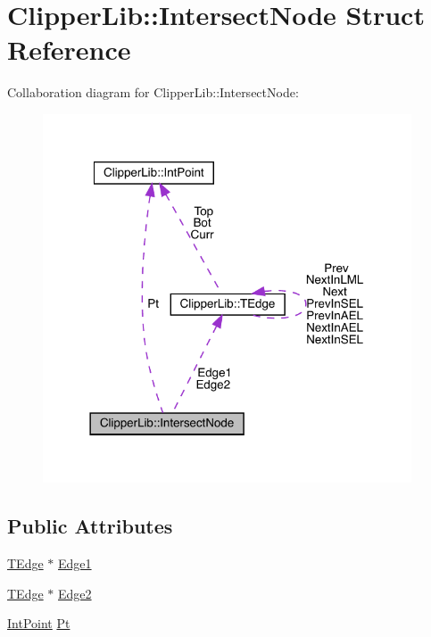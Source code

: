 \hypertarget{struct_clipper_lib_1_1_intersect_node}{}\section{Clipper\+Lib\+::Intersect\+Node Struct Reference}
\label{struct_clipper_lib_1_1_intersect_node}


Collaboration diagram for Clipper\+Lib\+::Intersect\+Node\+:
\nopagebreak
\begin{figure}[H]
\begin{center}
\leavevmode
\includegraphics[width=310pt]{struct_clipper_lib_1_1_intersect_node__coll__graph}
\end{center}
\end{figure}
\subsection*{Public Attributes}
\begin{DoxyCompactItemize}
\item 
\mbox{\hyperlink{struct_clipper_lib_1_1_t_edge}{T\+Edge}} $\ast$ \mbox{\hyperlink{struct_clipper_lib_1_1_intersect_node_a43fd790cc38441edb594841d79b25f13}{Edge1}}
\item 
\mbox{\hyperlink{struct_clipper_lib_1_1_t_edge}{T\+Edge}} $\ast$ \mbox{\hyperlink{struct_clipper_lib_1_1_intersect_node_afcb56e7564fedf1c90962a9f75454539}{Edge2}}
\item 
\mbox{\hyperlink{struct_clipper_lib_1_1_int_point}{Int\+Point}} \mbox{\hyperlink{struct_clipper_lib_1_1_intersect_node_a91fc92370fb47797dae0602443e6475e}{Pt}}
\end{DoxyCompactItemize}


